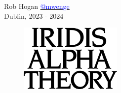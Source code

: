 Rob Hogan \href{https://mastodon.social/@mwenge}{\textcolor{blue}{@mwenge}}\\
Dublin, 2023 - 2024 \\

\clearpage
\vspace*{\fill}
\begin{figure}[H]
    \centering
      \includegraphics[width=5cm]{src/cover/title_page.png}%
\end{figure}
\vspace*{\fill}
\thispagestyle{empty}%
\clearpage

